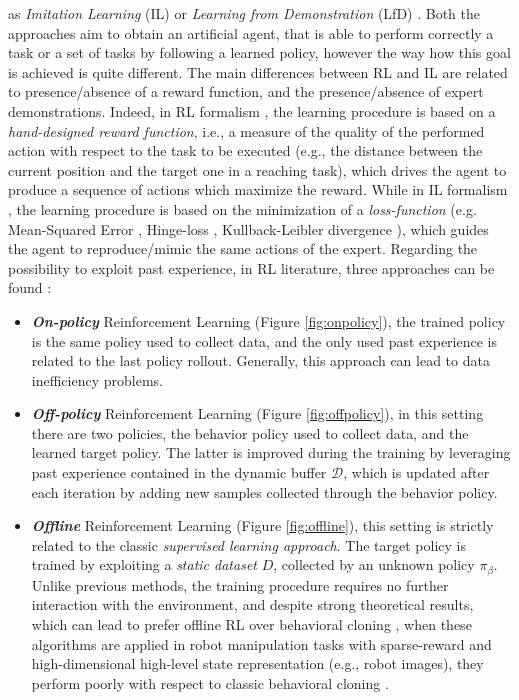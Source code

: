 as \textit{Imitation Learning} (IL) or \textit{Learning from Demonstration} (LfD)
\cite{argall2009robot_learning_from_demonstration}. Both the approaches aim to obtain an artificial agent, that is able to
perform correctly a task or a set of tasks by following a learned policy, however the way how this goal is achieved is
quite different. The main differences between RL and IL are related to presence/absence of a reward function, and the
presence/absence of expert demonstrations. \newline Indeed, in RL formalism \cite{kaelbling1996reinforcement_survey},
the learning procedure is based on a \textit{hand-designed reward function}, i.e., a measure of the quality of the
performed action with respect to the task to be executed (e.g., the distance between the current position and the target
one in a reaching task), which drives the agent to produce a sequence of actions which maximize the reward.
While in IL formalism \cite{osa2018algorithmic}, the learning procedure is based on the minimization of a
\textit{loss-function} (e.g. Mean-Squared Error \cite{james2013introduction_to_sl}, Hinge-loss \cite{cortes1995support},
Kullback-Leibler divergence \cite{kullback1951information}), which guides the agent to reproduce/mimic the same actions
of the expert. \newline Regarding the possibility to exploit past experience, in RL literature, three approaches can be
found \cite{levine202rl_tutorial}:
\begin{itemize}
    \item \textbf{\textit{On-policy}} Reinforcement Learning (Figure \ref{fig:onpolicy}), the trained policy is the same
    policy used to collect data, and the only used past experience is related to the last policy rollout. Generally, this approach can lead to data inefficiency problems.
    \item \textbf{\textit{Off-policy}} Reinforcement Learning (Figure \ref{fig:offpolicy}), in this setting there are two policies, the behavior policy used to collect data, and the learned target policy. The latter is improved during the training by leveraging past experience contained in the dynamic buffer $\mathcal{D}$, which is updated after each iteration by adding new samples collected through the behavior policy.
    \item \textbf{\textit{Offline}} Reinforcement Learning (Figure \ref{fig:offline}), this setting is strictly related to the
    classic \textit{supervised learning approach}. The target policy is trained by exploiting a \textit{static dataset} $D$,
    collected by an unknown policy $\pi_{\beta}$. Unlike previous methods, the training procedure requires no further interaction with the environment, and despite strong theoretical results, which can lead to prefer offline RL over behavioral cloning \cite{kumar2021orl_vs_bc}, when these algorithms are applied in robot manipulation tasks with sparse-reward and high-dimensional high-level state representation (e.g., robot images), they perform poorly with respect to classic behavioral cloning \cite{mandlekar2022matters}.
\end{itemize}
